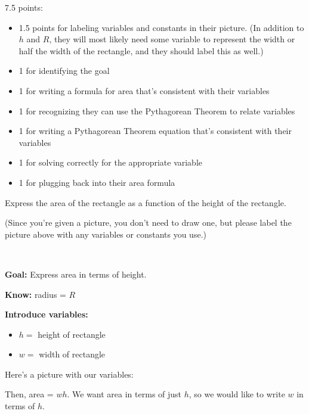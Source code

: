 \documentclass{article}
\begin{document}
\begin{enumerate}[resume]
\begin{enumerate}
    \begin{grading}
      7.5 points:
      \begin{itemize}[nosep]
      \item 1.5 points for labeling variables and constants in their picture. (In addition to $h$ and $R$, they will most likely need some variable to represent the width or half the width of the rectangle, and they should label this as well.)
      \item 1 for identifying the goal
      \item 1 for writing a formula for area that's consistent with their variables
      \item 1 for recognizing they can use the Pythagorean Theorem to relate variables
      \item 1 for writing a Pythagorean Theorem equation that's consistent with their variables
      \item 1 for solving correctly for the appropriate variable
      \item 1 for plugging back into their area formula
      \end{itemize}
    \end{grading}

    \begin{problem}[\newpage]
      Express the area of the rectangle as a function of the height of the rectangle.

      (Since you're given a picture, you don't need to draw one, but please label the picture above with any variables or constants you use.)
    \end{problem}

    \begin{solution}\

      \textbf{Goal:} Express area in terms of height.

      \textbf{Know:} radius = $R$

      \textbf{Introduce variables:}
      \begin{itemize}[nosep]
      \item $h = $ height of rectangle
      \item $w = $ width of rectangle 
      \end{itemize}

      Here's a picture with our variables:
      \begin{center}
      \end{center}
      Then, area = $wh$. We want area in terms of just $h$, so we would like to write $w$ in terms of $h$.


\end{solution}
\end{enumerate}
\end{enumerate}
\end{document}
